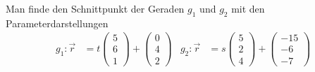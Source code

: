 \begin{beispiel}
Man finde den Schnittpunkt der Geraden $g_1$ und $g_2$ mit den
Parameterdarstellungen
\begin{align*}
g_1:
\vec r
&=t\begin{pmatrix}5\\6\\1\end{pmatrix}+\begin{pmatrix}0\\4\\2\end{pmatrix}
&
g_2:
\vec r
&=s\begin{pmatrix}5\\2\\4\end{pmatrix}+\begin{pmatrix}-15\\-6\\-7\end{pmatrix}
\end{align*}

\smallskip


\end{beispiel}
